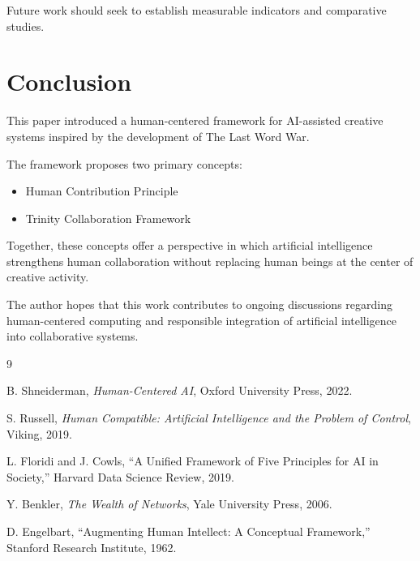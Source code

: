 \documentclass[11pt]{article}
\begin{document}
Future work should seek to establish measurable indicators and comparative studies.

\section{Conclusion}

This paper introduced a human-centered framework for AI-assisted creative systems inspired by the development of The Last Word War.

The framework proposes two primary concepts:

\begin{itemize}
\item Human Contribution Principle
\item Trinity Collaboration Framework
\end{itemize}

Together, these concepts offer a perspective in which artificial intelligence strengthens human collaboration without replacing human beings at the center of creative activity.

The author hopes that this work contributes to ongoing discussions regarding human-centered computing and responsible integration of artificial intelligence into collaborative systems.

\begin{thebibliography}{9}

B. Shneiderman,
\textit{Human-Centered AI},
Oxford University Press,
2022.

S. Russell,
\textit{Human Compatible: Artificial Intelligence and the Problem of Control},
Viking,
2019.

L. Floridi and J. Cowls,
``A Unified Framework of Five Principles for AI in Society,''
Harvard Data Science Review,
2019.

Y. Benkler,
\textit{The Wealth of Networks},
Yale University Press,
2006.

D. Engelbart,
``Augmenting Human Intellect: A Conceptual Framework,''
Stanford Research Institute,
1962.

\end{thebibliography}
\end{document}
